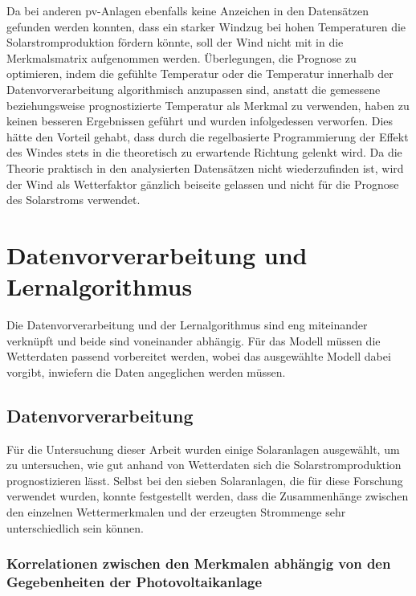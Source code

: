 \documentclass[12pt, a4paper]{article}
\begin{document}
Da bei anderen \ac{pv}-Anlagen ebenfalls keine Anzeichen in den Datensätzen gefunden werden konnten, dass ein starker Windzug bei hohen Temperaturen die Solarstromproduktion fördern könnte, soll der Wind nicht mit in die Merkmalsmatrix aufgenommen werden. Überlegungen, die Prognose zu optimieren, indem die gefühlte Temperatur oder die Temperatur innerhalb der Datenvorverarbeitung algorithmisch anzupassen sind, anstatt die gemessene beziehungsweise prognostizierte Temperatur als Merkmal zu verwenden, haben zu keinen besseren Ergebnissen geführt und wurden infolgedessen verworfen. Dies hätte den Vorteil gehabt, dass durch die regelbasierte Programmierung der Effekt des Windes stets in die theoretisch zu erwartende Richtung gelenkt wird. Da die Theorie praktisch in den analysierten Datensätzen nicht wiederzufinden ist, wird der Wind als Wetterfaktor gänzlich beiseite gelassen und nicht für die Prognose des Solarstroms verwendet.


\newpage

\section{Datenvorverarbeitung und Lernalgorithmus}
\label{sec:data_algorithm}

Die Datenvorverarbeitung und der Lernalgorithmus sind eng miteinander verknüpft und beide sind voneinander abhängig. Für das Modell müssen die Wetterdaten passend vorbereitet werden, wobei das ausgewählte Modell dabei vorgibt, inwiefern die Daten angeglichen werden müssen. 

\subsection{Datenvorverarbeitung}

Für die Untersuchung dieser Arbeit wurden einige Solaranlagen ausgewählt, um zu untersuchen, wie gut anhand von Wetterdaten sich die Solarstromproduktion prognostizieren lässt. Selbst bei den sieben Solaranlagen, die für diese Forschung verwendet wurden, konnte festgestellt werden, dass die Zusammenhänge zwischen den einzelnen Wettermerkmalen und der erzeugten Strommenge sehr unterschiedlich sein können.

\subsubsection{Korrelationen zwischen den Merkmalen abhängig von den Gegebenheiten der Photovoltaikanlage}
\end{document}
